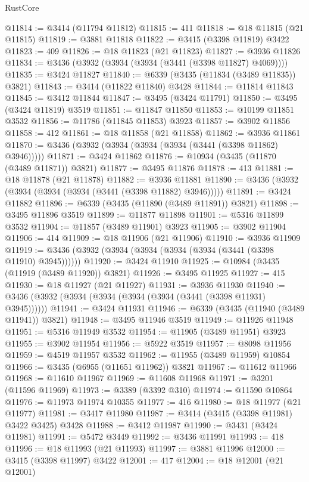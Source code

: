 \begin{lexlean}{RustCore}
\begin{coremodule}
@11814 := @3414 (@11794 @11812)
@11815 := 411
@11818 := @18 @11815 (@21 @11815)
@11819 := @3881 @11818
@11822 := @3415 (@3398 @11819) @3422
@11823 := 409
@11826 := @18 @11823 (@21 @11823)
@11827 := @3936 @11826
@11834 := @3436 (@3932 (@3934 (@3934 (@3441 (@3398 @11827) @4069))))
@11835 := @3424 @11827
@11840 := @6339 (@3435 (@11834 (@3489 @11835)) @3821)
@11843 := @3414 (@11822 @11840) @3428
@11844 := @11814 @11843
@11845 := @3412 @11844
@11847 := @3495 (@3424 @11791)
@11850 := @3495 (@3424 @11819) @3519
@11851 := @11847 @11850
@11853 := @10199 @11851 @3532
@11856 := @11786 (@11845 @11853) @3923
@11857 := @3902 @11856
@11858 := 412
@11861 := @18 @11858 (@21 @11858)
@11862 := @3936 @11861
@11870 := @3436 (@3932 (@3934 (@3934 (@3934 (@3441 (@3398 @11862) @3946)))))
@11871 := @3424 @11862
@11876 := @10934 (@3435 (@11870 (@3489 @11871)) @3821)
@11877 := @3495 @11876
@11878 := 413
@11881 := @18 @11878 (@21 @11878)
@11882 := @3936 @11881
@11890 := @3436 (@3932 (@3934 (@3934 (@3934 (@3441 (@3398 @11882) @3946)))))
@11891 := @3424 @11882
@11896 := @6339 (@3435 (@11890 (@3489 @11891)) @3821)
@11898 := @3495 @11896 @3519
@11899 := @11877 @11898
@11901 := @5316 @11899 @3532
@11904 := @11857 (@3489 @11901) @3923
@11905 := @3902 @11904
@11906 := 414
@11909 := @18 @11906 (@21 @11906)
@11910 := @3936 @11909
@11919 := @3436 (@3932 (@3934 (@3934 (@3934 (@3934 (@3441 (@3398 @11910) @3945))))))
@11920 := @3424 @11910
@11925 := @10984 (@3435 (@11919 (@3489 @11920)) @3821)
@11926 := @3495 @11925
@11927 := 415
@11930 := @18 @11927 (@21 @11927)
@11931 := @3936 @11930
@11940 := @3436 (@3932 (@3934 (@3934 (@3934 (@3934 (@3441 (@3398 @11931) @3945))))))
@11941 := @3424 @11931
@11946 := @6339 (@3435 (@11940 (@3489 @11941)) @3821)
@11948 := @3495 @11946 @3519
@11949 := @11926 @11948
@11951 := @5316 @11949 @3532
@11954 := @11905 (@3489 @11951) @3923
@11955 := @3902 @11954
@11956 := @5922 @3519
@11957 := @8098 @11956
@11959 := @4519 @11957 @3532
@11962 := @11955 (@3489 @11959) @10854
@11966 := @3435 (@6955 (@11651 @11962)) @3821
@11967 := @11612 @11966
@11968 := @11610 @11967
@11969 := @11608 @11968
@11971 := @3201 (@11596 @11969)
@11973 := @3389 (@3392 @310)
@11974 := @11590 @10864
@11976 := @11973 @11974 @10355
@11977 := 416
@11980 := @18 @11977 (@21 @11977)
@11981 := @3417 @11980
@11987 := @3414 (@3415 (@3398 @11981) @3422 @3425) @3428
@11988 := @3412 @11987
@11990 := @3431 (@3424 @11981)
@11991 := @5472 @3449
@11992 := @3436 @11991
@11993 := 418
@11996 := @18 @11993 (@21 @11993)
@11997 := @3881 @11996
@12000 := @3415 (@3398 @11997) @3422
@12001 := 417
@12004 := @18 @12001 (@21 @12001)

\end{coremodule}
\end{lexlean}
